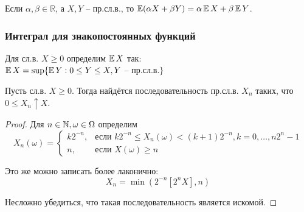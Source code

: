     \begin{col}\label{lect07:col1}
        Если $\alpha,\beta\in\mathbb{R}$, а $X,Y$ -- пр.сл.в., то $\operatorname*{\mathbb{E}} (\alpha X+\beta Y) = \alpha\operatorname*{\mathbb{E}} X+\beta\operatorname*{\mathbb{E}} Y$.
    \end{col}
    
    \subsubsection{Интеграл для знакопостоянных функций}
    
    \begin{definition}\label{lect07:def3}
        Для сл.в. $X\ge 0$ определим $\operatorname*{\mathbb{E}} X$ так:\\ $\operatorname*{\mathbb{E}} X = \sup\{\operatorname*{\mathbb{E}} Y: 0\le Y\le X, Y$ -- пр.сл.в.$\}$
    \end{definition}
    
    \begin{lemma}\label{lect07:lemma1}
        Пусть сл.в. $X\ge 0$. Тогда найдётся последовательность пр.сл.в. $X_n$ таких, что $0\le X_n \uparrow X$.
    \end{lemma}
    \begin{proof}
        Для $ n\in\mathbb{N}, \omega\in\Omega $ определим 
        $$ 
        X_n (\omega) = \begin{cases}
        k2^{-n},&\text{если $k2^{-n}\le X_n(\omega) < (k+1)2^{-n}, k=0,\ldots,n2^{n}-1$}\\
        n,&\text{если $X(\omega)\ge n$}
        \end{cases}
        $$
        
        Это же можно записать более лаконично:
        $$
            X_n=\min\left(2^{-n}[2^n X],n\right)
        $$
        
        Несложно убедиться, что такая последовательность является искомой.
    \end{proof}
    
